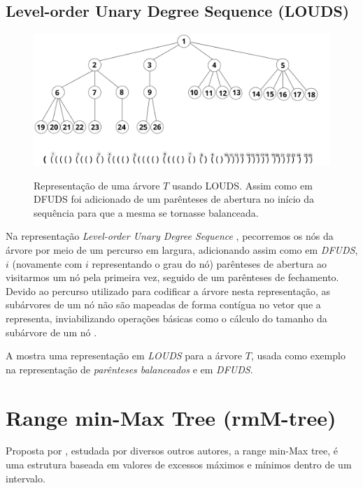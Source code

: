\subsection{Level-order Unary Degree Sequence (LOUDS)}
\begin{figure}[h!]
    \centering
      \caption[Representação de árvores com Level-order Unary Degree Sequence]{Representação de uma árvore $T$ usando LOUDS. 
      Assim como em DFUDS foi adicionado de um parênteses de abertura no início da sequência  para que a mesma se tornasse balanceada.}
      \includegraphics[width=\columnwidth]{images/louds.png}
      \label{fig:louds-representation}
\end{figure}
Na representação \textit{Level-order Unary Degree Sequence} \citep{article-louds,article-dfuds}, pecorremos os nós da árvore por meio de um percurso em largura, adicionando assim como em \textit{DFUDS}, $i$ (novamente com $i$ representando o grau do nó) parênteses de abertura ao visitarmos um nó pela primeira vez, seguido de um parênteses de fechamento.
 Devido ao percurso utilizado para codificar a árvore nesta representação, as subárvores de um nó não são mapeadas de forma contígua no vetor que a representa, inviabilizando operações básicas como o cálculo do tamanho da subárvore de um nó \citep{book-compact-data-structures,paper-fully-functinal-succint-trees}.

A  mostra uma representação em \textit{LOUDS} para a árvore $T$, usada como exemplo na representação de \textit{parênteses balanceados} e em \textit{DFUDS}.

\section{Range min-Max Tree (rmM-tree)}\label{sec:sec-classic-rmm-tree}
Proposta por \citet{paper-fully-functinal-succint-trees}, estudada por diversos outros autores, a range min-Max tree, é uma estrutura baseada em valores de excessos máximos e mínimos dentro de um intervalo. 

